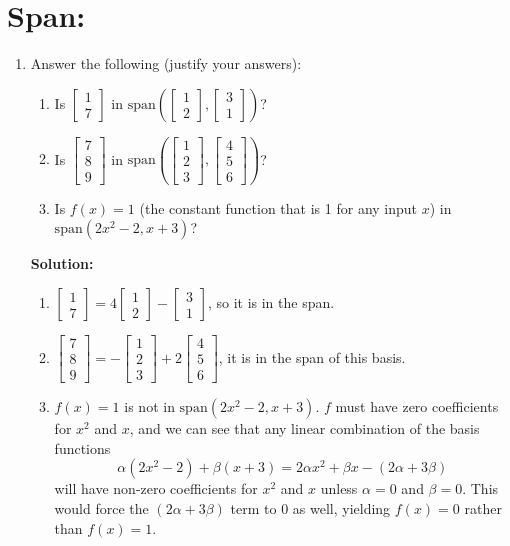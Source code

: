 \documentclass[]{article}
\newcommand{\bbm}{\begin{bmatrix}}
\newcommand{\ebm}{\end{bmatrix}}
\newcommand{\vspan}{\mathrm{span}}
\newcommand{\solution}{\vskip 0.5cm \textbf{\large Solution:} \\}
\begin{document}
    \section*{Span:}
    \begin{enumerate}[resume]
	\item Answer the following (justify your answers):
	  \begin{enumerate}
	  \item Is $\bbm 1\\7\ebm$ in $\vspan \left(\bbm 1\\2 \ebm,\bbm 3\\1 \ebm \right)$?
	  \item Is $\bbm 7\\8\\9\ebm$ in $\vspan\left(\bbm 1\\2\\3 \ebm,\bbm 4\\5\\6 \ebm \right)$?
	  \item Is $f(x)=1$ (the constant function that is 1 for any input $x$) in $\vspan(2x^2-2, x+3)$?
	  \end{enumerate}
      
	  \solution
	  \begin{enumerate}
	  \item
        $\bbm 1\\7\ebm = 4 \bbm 1\\2 \ebm - \bbm 3\\1 \ebm$, so it is
        in the span.
        
	  \item $\bbm 7\\8\\9\ebm = -\bbm 1\\2\\3 \ebm + 2 \bbm 4\\5\\6
        \ebm$, it is in the span of this basis.

	  \item $f(x) = 1$ is not in $\vspan(2x^2-2, x+3)$. $f$ must have
        zero coefficients for $x^2$ and $x$, and we can see that any
        linear combination of the basis functions
        \[
        \alpha(2x^2 - 2) + \beta(x + 3) = 2 \alpha x^2 + \beta x - (2\alpha + 3\beta)
        \]
        will have non-zero coefficients for $x^2$ and $x$ unless
        $\alpha = 0$ and $\beta = 0$. This would force the $(2\alpha +
        3\beta)$ term to 0 as well, yielding $f(x) = 0$ rather than
        $f(x) = 1$.
	  \end{enumerate}
    \end{enumerate}
\end{document}
